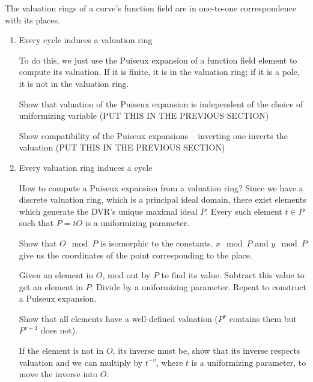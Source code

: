 \begin{theorem}
The valuation rings of a curve's function field are in one-to-one correspondence with its places.

\proof
\begin{enumerate}
\item Every cycle induces a valuation ring

To do this, we just use the Puiseux expansion of a function field element to compute its valuation.
If it is finite, it is in the valuation ring; if it is a pole, it is not in the valuation ring.

Show that valuation of the Puiseux expansion is independent of the choice of uniformizing variable
(PUT THIS IN THE PREVIOUS SECTION)

Show compatibility of the Puiseux expansions -- inverting one inverts the valuation
(PUT THIS IN THE PREVIOUS SECTION)

\item Every valuation ring induces a cycle

How to compute a Puiseux expansion from a valuation ring?  Since we have a discrete
valuation ring, which is a principal ideal domain, there exist elements which generate
the DVR's unique maximal ideal $P$.  Every such element $t \in P$ such that $P=tO$ is a uniformizing parameter.

Show that $O \mod P$ is isomorphic to the constants.  $x \mod P$ and $y \mod P$ give us the coordinates
of the point corresponding to the place.

Given an element in $O$, mod out by $P$ to find its value.  Subtract this value to get an element in $P$.
Divide by a uniformizing parameter.  Repeat to construct a Puiseux expansion.

Show that all elements have a well-defined valuation ($P^v$ contains them but $P^{v+1}$ does not).

If the element is not in $O$, its inverse must be, show that its inverse respects valuation and we can
multiply by $t^{-v}$, where $t$ is a uniformizing parameter, to move the inverse into $O$.


\end{enumerate}
\end{theorem}

